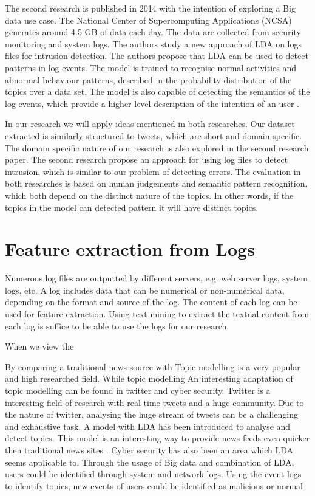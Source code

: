 The second research is published in 2014 with the intention of exploring a Big data use case. The National Center of Supercomputing Applications (NCSA) generates around 4.5 GB of data each day. The data are collected from security monitoring and system logs. The authors study a new approach of LDA on logs files for intrusion detection. The authors propose that LDA can be used to detect patterns in log events. The model is trained to recognise normal activities and abnormal behaviour patterns, described in the probability distribution of the topics over a data set. The model is also capable of detecting the semantics of the log events, which provide a higher level description of the intention of an user \cite{Jingwei2014KnowledgeLDA}. 

In our research we will apply ideas mentioned in both researches. Our dataset extracted is similarly structured to tweets, which are short and domain specific. The domain specific nature of our research is also explored in the second research paper. The second research propose an approach for using log files to detect intrusion, which is similar to our problem of detecting errors. The evaluation in both researches is based on human judgements and semantic pattern recognition, which both depend on the distinct nature of the topics. In other words, if the topics in the model can detected pattern it will have distinct topics.

\section{Feature extraction from Logs} \label{theory:featureextraction}
Numerous log files are outputted by different servers, e.g. web server logs, system logs, etc. A log includes data that can be numerical or non-numerical data, depending on the format and source of the log. The content of each log can be used for feature extraction. Using text mining to extract the textual content from each log is suffice to be able to use the logs for our research.

\setlength{\parindent}{3ex}  When we view the 

\cite{Xu2009DetectingLogs}

By comparing a traditional news source with
Topic modelling is a very popular and high researched field. While topic modelling  
An interesting adaptation of topic modelling can be found in twitter and cyber security. Twitter is a interesting field of research with real time tweets and a huge community. Due to the nature of twitter, analysing the huge stream of tweets can be a challenging and exhaustive task. A model with LDA has been introduced to analyse and detect topics. This model is an interesting way to provide news feeds even quicker then traditional news sites . Cyber security has also been an area which LDA seems applicable to. Through the usage of Big data and combination of LDA, users could be identified through system and network logs. Using the event logs to identify topics, new events of users could be identified as malicious or normal 


